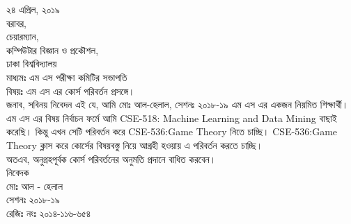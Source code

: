 \documentclass[a4paper]{article}
\begin{document}
\fontsize{17}{20}
\selectfont
\vfill
\noindent
২৪ এপ্রিল, ২০১৯\\ 

\noindent
বরাবর,\\ 
চেয়ারম্যান,\\ 
কম্পিউটার বিজ্ঞান ও প্রকৌশল,\\
ঢাকা বিশ্ববিদ্যালয়\\

\noindent
মাধ্যমঃ এম এস পরীক্ষা কমিটির সভাপতি\\

\noindent
বিষয়ঃ এম এস এর কোর্স পরিবর্তন প্রসঙ্গে।\\

\noindent
জনাব,
সবিনয় নিবেদন এই যে, আমি মোঃ আল-হেলাল, সেশনঃ ২০১৮-১৯ এম এস এর একজন নিয়মিত শিক্ষার্থী। এম এস এর বিষয় নির্বাচন ফর্মে আমি CSE-518: Machine Learning and Data Mining বাছাই করেছি। কিন্তু এখন সেটি পরিবর্তন করে CSE-536:Game Theory নিতে চাচ্ছি। CSE-536:Game Theory ক্লাস করে কোর্সের বিষয়বস্তু নিয়ে আগ্রহী হওয়ায় এ পরিবর্তন করতে চাচ্ছি।\\

\noindent
অতএব, অনুগ্রহপূর্বক কোর্স পরিবর্তনের অনুমতি প্রদানে বাধিত করবেন। \\

\noindent
নিবেদক\\
মোঃ আল - হেলাল\\
সেশনঃ ২০১৮-১৯\\
রেজিঃ নংঃ ২০১৪-১১৬-৬৫৪\\
\end{document}
